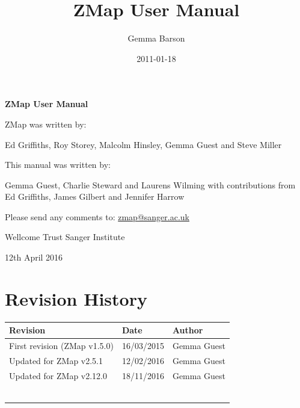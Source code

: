 \documentclass[letterpaper]{article}
\title{ZMap User Manual}
\author{Gemma Barson}
\date{2011-01-18}
\begin{document}
\setcounter{page}{1}\pagestyle{Standard}


\thispagestyle{FirstPage}
{\centering\sffamily\bfseries\color[rgb]{0.0,0.27058825,0.5254902}
\Huge\bf{ZMap User Manual}\par}

\bigskip

\bigskip

{\centering\large{ZMap was written by:}\par
\large{Ed Griffiths, Roy Storey, Malcolm Hinsley, Gemma Guest and Steve Miller}\par
}

\bigskip

\bigskip

{\centering\large{This manual was written by:}\par
\large{Gemma Guest, Charlie Steward and Laurens Wilming with contributions from
Ed Griffiths, James Gilbert and Jennifer Harrow}\par
}


\bigskip

\bigskip

{\centering\large{Please send any comments to: \href{mailto:zmap@sanger.ac.uk}{zmap@sanger.ac.uk}}\par
}


\bigskip

\bigskip

{\centering\large{Wellcome Trust Sanger Institute}\par}
{\centering12th April 2016\par}




\clearpage
{\color[rgb]{0.0,0.27058825,0.5254902}\section[Revision History]{Revision History}}
\hypertarget{RefHeading334316266717}{}

\begin{center}
\tablehead{}
\begin{supertabular}{|m{8cm}|m{3.2849998cm}|m{3.282cm}|}
\hline
\bfseries Revision &
\bfseries Date &
\bfseries Author\\\hline
 First revision (ZMap v1.5.0) &
 16/03/2015 &
 Gemma Guest\\\hline
 Updated for ZMap v2.5.1 &
 12/02/2016 &
 Gemma Guest\\\hline
 Updated for ZMap v2.12.0 &
 18/11/2016 &
 Gemma Guest\\\hline
 &
 &
 \\\hline
 &
 &
 \\\hline
 &
 &
 \\\hline
 &
 &
 \\\hline
 &
 &
 \\\hline
 &
 &
 \\\hline
\end{supertabular}
\end{center}
\end{document}
